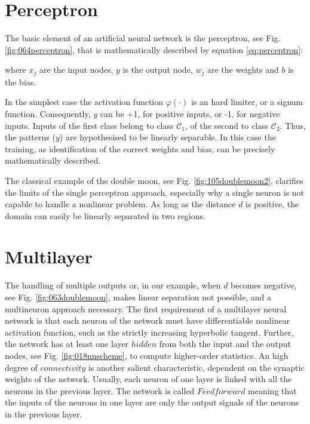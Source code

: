 \section{Perceptron}
\label{sec:perceptron}

The basic element of an artificial neural network is the perceptron, see Fig.
\ref{fig:064perceptron}, that is mathematically described by equation
\ref{eq:perceptron}: 

where $x_j$ are the input nodes, $y$ is the output node, $w_j$ are the weights
and $b$ is the bias.

In the simplest case  the activation function $\varphi(\cdot)$ is an hard
limiter, or a signum function.
Consequently, $y$ can be +1, for positive inputs, or -1, for negative inputs. Inputs of the first class
belong to class $\mathscr{C}_1$, of the second to class $\mathscr{C}_2$.
Thus, the patterns ($y$) are hypothesised to be linearly separable.
In this case the training, as identification of the correct weights and bias,
can be precisely mathematically described.

The classical example of the double moon, see Fig. \ref{fig:105doublemoon2},
clarifies the limits of the single perceptron approach, especially 
why a single neuron is not capable to handle a
nonlinear problem.
As long as the distance $d$ is positive, the domain can easily be
linearly separated in two regions.

\section{Multilayer}
\label{sec:multilayer}



The handling of multiple outputs or, in our example, 
when $d$ becomes negative, see Fig. \ref{fig:063doublemoon}, makes linear
separation not possible, and a multineuron approach necessary. 
The first requirement of a multilayer neural network
is that each neuron of the network must have differentiable nonlinear activation
function, such as the strictly increasing hyperbolic tangent.
Further, the network has at least one layer $hidden$ from both the input and the
output nodes, see Fig. \ref{fig:018nnscheme}, to compute higher-order
statistics.
An high degree of $connectivity$ is another salient characteristic, dependent on
the synaptic weights of the network.
Usually, each neuron of one layer is linked with all the neurons in the previous
layer.
The network is called $Feedforward$ meaning that the inputs of the neurons in
one layer are only the output signals of the neurons in the previous layer.\\

